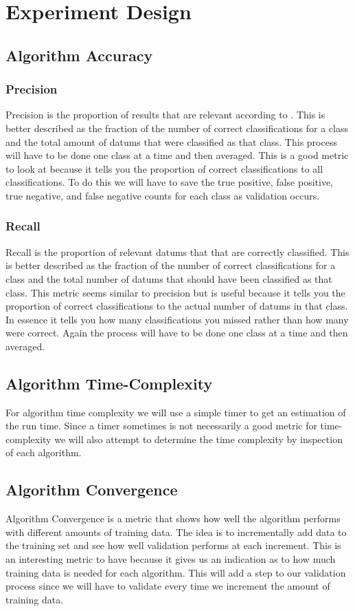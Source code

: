 \documentclass{article}
\begin{document}
	\section{Experiment Design}
		\subsection{Algorithm Accuracy}
			\subsubsection{Precision}
				Precision is the proportion of results that are relevant according to \cite{ai}. 
				This is better described as the fraction of the number of correct classifications for a class and the total amount of datums that were classified as that class. 
				This process will have to be done one class at a time and then averaged.
				This is a good metric to look at because it tells you the proportion of correct classifications to all classifications. 
				To do this we will have to save the true positive, false positive, true negative, and false negative counts for each class as validation occurs.

			\subsubsection{Recall}
				Recall is the proportion of relevant datums that that are correctly classified. 
				This is better described as the fraction of the number of correct classifications for a class and the total number of datums that should have been classified as that class. 
				This metric seems similar to precision but is useful because it tells you the proportion of correct classifications to the actual number of datums in that class. 
				In essence it tells you how many classifications you missed rather than how many were correct. 
				Again the process will have to be done one class at a time and then averaged. 
		\subsection{Algorithm Time-Complexity}
			For algorithm time complexity we will use a simple timer to get an estimation of the run time. 
			Since a timer sometimes is not necessarily a good metric for time-complexity we will also attempt to determine the time complexity by inspection of each algorithm.
		\subsection{Algorithm Convergence}
			\label{convergence}
			Algorithm Convergence is a metric that shows how well the algorithm performs with different amounts of training data. 
			The idea is to incrementally add data to the training set and see how well validation performs at each increment. 
			This is an interesting metric to have because it gives us an indication as to how much training data is needed for each algorithm. 
			This will add a step to our validation process since we will have to validate every time we increment the amount of training data.
\end{document}
